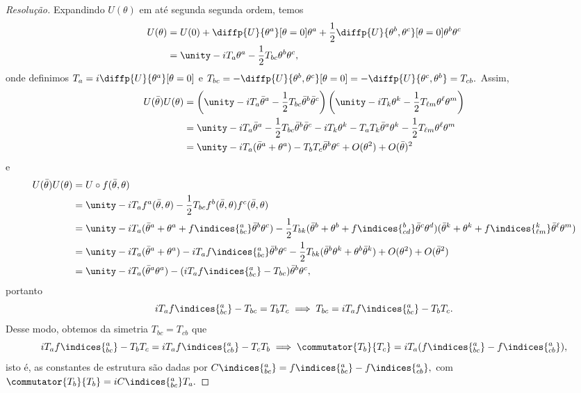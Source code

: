 \begin{proof}[Resolução]
   Expandindo \(U(\theta)\) em até segunda segunda ordem, temos
   \begin{align*}
      U(\theta) &= U(0) + \diffp{U}{\theta^a}[\theta = 0] \theta^a + \frac12 \diffp{U}{\theta^b,\theta^c}[\theta = 0] \theta^b\theta^c\\
                &= \unity - i T_a \theta^a - \frac12 T_{bc} \theta^b \theta^c,
   \end{align*}
   onde definimos \(T_a = i \diffp{U}{\theta^a}[\theta = 0]\) e \(T_{bc} = - \diffp{U}{\theta^b,\theta^c}[\theta=0] = - \diffp{U}{\theta^c,\theta^b} = T_{cb}.\) Assim,
   \begin{align*}
      U(\bar{\theta}) U(\theta) &= \left(\unity - i T_a \bar{\theta}^a - \frac12 T_{bc} \bar{\theta}^b \bar{\theta}^c\right)\left(\unity - i T_k \theta^k - \frac12 T_{\ell m} \theta^\ell \theta^m\right)\\
                                &= \unity -i T_a \bar{\theta}^a - \frac12 T_{bc} \bar{\theta}^b \bar{\theta}^c -i T_k \theta^k - T_a T_k \bar{\theta}^a \theta^k - \frac12 T_{\ell m} \theta^\ell \theta^m\\
                                &= \unity - i T_a (\bar{\theta}^a + \theta^a) - T_b T_c \bar{\theta}^b \theta^c + O(\theta^2) + O(\bar{\theta})^2
   \end{align*}
   e
   \begin{align*}
      U(\bar{\theta}) U(\theta) &= U \circ f(\bar{\theta},\theta)\\
                                &= \unity - i T_a f^a(\bar{\theta}, \theta) -\frac12 T_{bc} f^{b}(\bar{\theta}, \theta) f^{c}(\bar{\theta},\theta)\\
                                &= \unity - iT_a (\bar{\theta}^a + \theta^a + f\indices{^a_{bc}} \bar{\theta}^b \theta^c) - \frac12 T_{bk} (\bar{\theta}^b + \theta^b + f\indices{^b_{cd}} \bar{\theta}^c \theta^d)(\bar{\theta}^k + \theta^k + f\indices{^k_{\ell m}} \bar{\theta}^\ell \theta^m)\\
                                &= \unity - i T_a(\bar{\theta}^a + \theta^a) -i T_a f\indices{^a_{bc}} \bar{\theta}^b \theta^c - \frac12 T_{bk} (\bar{\theta}^b \theta^k + \theta^b \bar{\theta}^k) + O(\theta^2) + O(\bar{\theta}^2)\\
                                &= \unity - iT_a(\bar{\theta}^a \theta^a) - (iT_a f\indices{^a_{bc}} - T_{bc})\bar{\theta}^b \theta^c,
   \end{align*}
   portanto
   \begin{equation*}
      iT_a f\indices{^a_{bc}} - T_{bc} = T_b T_c \implies T_{bc} = i T_a f\indices{^a_{bc}} - T_b T_c.
   \end{equation*}
   Desse modo, obtemos da simetria \(T_{bc} = T_{cb}\) que
   \begin{equation*}
      iT_a f\indices{^a_{bc}} - T_b T_c = iT_a f\indices{^a_{cb}} - T_c T_b \implies \commutator{T_b}{T_c} = i T_a (f\indices{^a_{bc}} - f\indices{^a_{cb}}),
   \end{equation*}
   isto é, as constantes de estrutura são dadas por \(C\indices{^a_{bc}} = f\indices{^a_{bc}} - f\indices{^a_{cb}},\) com \(\commutator{T_b}{T_b} = i C\indices{^a_{bc}} T_a.\)
\end{proof}
